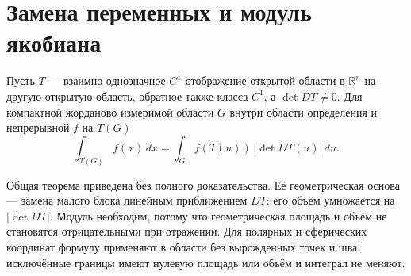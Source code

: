 \section{Замена переменных и модуль якобиана}
\begin{theorem}\label{thm:change-variables}
Пусть \(T\) — взаимно однозначное \(C^1\)-отображение открытой области в \(\mathbb R^n\) на другую открытую область, обратное также класса \(C^1\), а \(\det DT\ne0\). Для компактной жорданово измеримой области \(G\) внутри области определения и непрерывной \(f\) на \(T(G)\)
\[
\int_{T(G)}f(x)\,dx
=\int_G f(T(u))\,|\det DT(u)|\,du.
\]
\end{theorem}
Общая теорема приведена без полного доказательства. Её геометрическая основа — замена малого блока линейным приближением \(DT\): его объём умножается на \(|\det DT|\). Модуль необходим, потому что геометрическая площадь и объём не становятся отрицательными при отражении. Для полярных и сферических координат формулу применяют в области без вырожденных точек и шва; исключённые границы имеют нулевую площадь или объём и интеграл не меняют.

